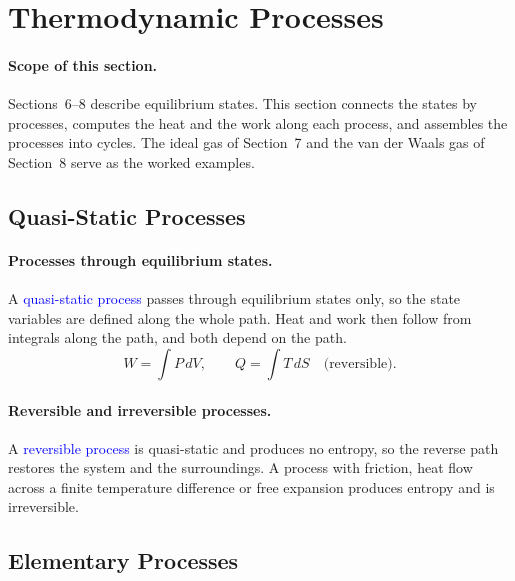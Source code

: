 
\section{Thermodynamic Processes}

\paragraph{Scope of this section.}
Sections~6--8 describe equilibrium states. This section connects the states
by processes, computes the heat and the work along each process, and
assembles the processes into cycles. The ideal gas of Section~7 and the van
der Waals gas of Section~8 serve as the worked examples.

\subsection{Quasi-Static Processes}

\paragraph{Processes through equilibrium states.}
A \textcolor{blue}{quasi-static process} passes through equilibrium states
only, so the state variables are defined along the whole path. Heat and
work then follow from integrals along the path, and both depend on the path.
\begin{equation}
    \boxed{W=\int P\,dV,\qquad Q=\int T\,dS\quad\text{(reversible)}.}
\end{equation}

\paragraph{Reversible and irreversible processes.}
A \textcolor{blue}{reversible process} is quasi-static and produces no
entropy, so the reverse path restores the system and the surroundings. A
process with friction, heat flow across a finite temperature difference or
free expansion produces entropy and is irreversible.

\subsection{Elementary Processes}

